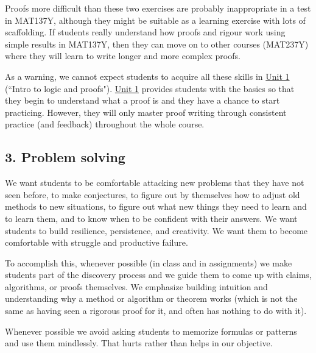 \documentclass[11pt]{article}
\begin{document}
	Proofs more difficult than these two exercises are probably inappropriate in a
	test in MAT137Y, although they might be suitable as a learning exercise with
	lots of scaffolding. If students really understand how proofs and rigour work using
	simple results in MAT137Y, then they can move on to other courses (MAT237Y)
	where they will learn to write longer and more complex proofs.

	As a warning, we cannot expect students to acquire all these skills in \hyperref[unit1]{Unit 1} (``Intro to logic and proofs"). \hyperref[unit1]{Unit 1} provides students with the basics so that they begin to understand what a proof is and they have a chance to start practicing. However, they will only master proof writing through consistent practice (and feedback) throughout the whole course. 

	\subsection{3. Problem solving}

	We want students to be comfortable attacking new problems that they have not
	seen before, to make conjectures, to figure out by themselves how to adjust
	old methods to new situations, to figure out what new things they need to learn
	and to learn them, and to know when to be confident with their answers. We want
	students to build resilience, persistence, and creativity. We want them to
	become comfortable with struggle and productive failure.

	To accomplish this, whenever possible (in class and in assignments) we make students part of the discovery process and we guide them to come up with claims, algorithms, or proofs themselves. We emphasize building intuition and understanding why a method or algorithm or theorem works (which is not the same as having seen a rigorous proof for it, and often has nothing to do with it).

	Whenever possible we avoid asking students to memorize formulas or patterns and use them mindlessly. That hurts rather than helps in our objective.


	\vfill
\end{document}
